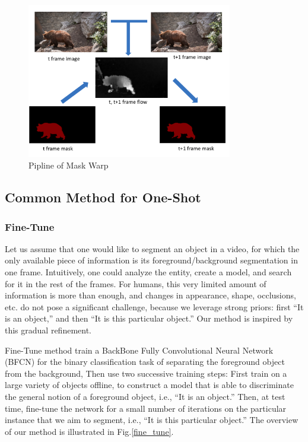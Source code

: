 \begin{figure}[ht]
    \centering
    \includegraphics[width=0.8\textwidth]{./figure/mask_warp.png}
    \caption{Pipline of Mask Warp}
    \label{mask_warp}
\end{figure}


\subsection{Common Method for One-Shot}

\subsubsection{Fine-Tune}
Let us assume that one would like to segment an object in a video, for which the only available piece of information is its foreground/background segmentation in one frame. Intuitively, one could analyze the entity, create a model, and search for it in the rest of the frames. For humans, this very limited amount of information is more than enough, and changes in appearance, shape, occlusions, etc. do not pose a significant challenge, because we leverage strong priors: first “It is an object,” and then “It is this particular object.” Our method is inspired by this gradual refinement.

Fine-Tune method \cite{OSVOS} \cite{OSVOS-S} \cite{OnAVOS} train a BackBone Fully Convolutional Neural Network (BFCN) for the binary classification task of separating the foreground object from the background, Then use two successive training steps: First train on a large variety of objects offline, to construct a model that is able to discriminate the general notion of a foreground object, i.e., “It is an object.” Then, at test time, fine-tune the network for a small number of iterations on the particular instance that we aim to segment, i.e., “It is this particular object.” The overview of our method is illustrated in Fig.\ref{fine_tune}.

